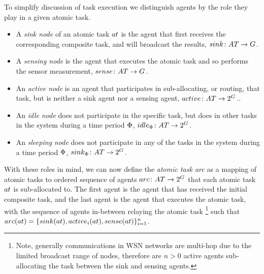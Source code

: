 To simplify discussion of task execution we distinguish agents by the role they play in a given atomic task.
\begin{itemize}
	\item A \textit{sink node} of an atomic task $\varAtomicTask{}{}$ is the agent that first receives the corresponding composite task, and will broadcast the results, $\formalSinkRole{}{}$.
	\item A \textit{sensing node} is the agent that executes the atomic task and so performs the sensor measurement, $\formalSenseRole{}{}$.
	\item An \textit{active node} is an agent that participates in sub-allocating, or routing, that task, but is neither a sink agent nor a sensing agent, $\formalActiveRole{}{}$..
	\item An \textit{idle node} does not participate in the specific task, but does in other tasks in the system during a time period $\Phi$, $\formalIdleRole{}{}$.
	\item An \textit{sleeping node} does not participate in any of the tasks in the system during a time period $\Phi$, $\formalSleepRole{}{}$.
\end{itemize}
With these roles in mind, we can now define the  \textit{atomic task arc} as a mapping of atomic tasks to ordered sequence of agents $\formalTaskArc{}{}$ that each atomic task $\varAtomicTask{}{}$ is sub-allocated to. The first agent is the agent that has received the initial composite task, and the last agent is the agent that executes the atomic task, with the sequence of agents in-between relaying the atomic task \footnote{Note, generally communications in WSN networks are multi-hop due to the limited broadcast range of nodes, therefore are $n>0$ active agents sub-allocating the task between the sink and sensing agents.} such that 
$\functionTaskArc{}{} = \lbrace \functionSinkRole{}{}, \functionActiveRole{i}{}, \functionSenseRole{}{} \rbrace_{i=1}^{n}$.

